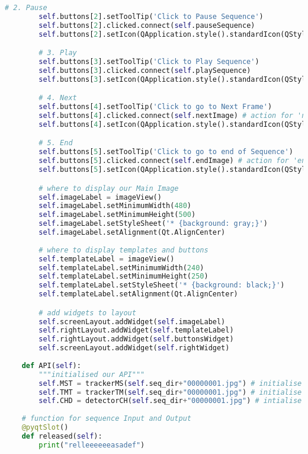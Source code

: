 \begin{lstlisting}[language=Python, caption={GUI Impementation Code}, captionpos=b, label={lst:gui}]
        # 2. Pause
        self.buttons[2].setToolTip('Click to Pause Sequence')
        self.buttons[2].clicked.connect(self.pauseSequence)
        self.buttons[2].setIcon(QApplication.style().standardIcon(QStyle.SP_MediaPause))

        # 3. Play
        self.buttons[3].setToolTip('Click to Play Sequence')
        self.buttons[3].clicked.connect(self.playSequence)
        self.buttons[3].setIcon(QApplication.style().standardIcon(QStyle.SP_MediaPlay))

        # 4. Next
        self.buttons[4].setToolTip('Click to go to Next Frame')
        self.buttons[4].clicked.connect(self.nextImage) # action for 'next' button
        self.buttons[4].setIcon(QApplication.style().standardIcon(QStyle.SP_MediaSeekForward))

        # 5. End
        self.buttons[5].setToolTip('Click to go to end of Sequence')
        self.buttons[5].clicked.connect(self.endImage) # action for 'end' button
        self.buttons[5].setIcon(QApplication.style().standardIcon(QStyle.SP_MediaSkipForward))

        # where to display our Main Image
        self.imageLabel = imageView()
        self.imageLabel.setMinimumWidth(480)
        self.imageLabel.setMinimumHeight(500)
        self.imageLabel.setStyleSheet('* {background: gray;}')
        self.imageLabel.setAlignment(Qt.AlignCenter)
        
        # where to display templates and buttons
        self.templateLabel = imageView()
        self.templateLabel.setMinimumWidth(240)
        self.templateLabel.setMinimumHeight(250)
        self.templateLabel.setStyleSheet('* {background: black;}')
        self.templateLabel.setAlignment(Qt.AlignCenter)

        # add widgets to layout
        self.screenLayout.addWidget(self.imageLabel)
        self.rightLayout.addWidget(self.templateLabel)
        self.rightLayout.addWidget(self.buttonsWidget)
        self.screenLayout.addWidget(self.rightWidget)
        
    def API(self):
        """initialised our API"""
        self.MST = trackerMS(self.seq_dir+"00000001.jpg") # initialise trackerMS object
        self.TMT = trackerTM(self.seq_dir+"00000001.jpg") # initialise trackerTM object
        self.CHD = detectorCH(self.seq_dir+"00000001.jpg") # intialise detectorCH object
                
    # function for sequence Input and Output
    @pyqtSlot()
    def released(self):
        print("relleeeeeeasadef")


\end{lstlisting}
